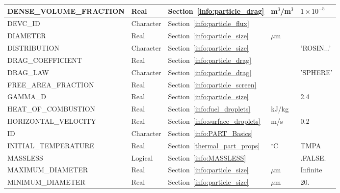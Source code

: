 \documentclass[11pt]{book}
\begin{document}
\begin{longtable}{@{\extracolsep{\fill}}|l|l|l|l|l|}
{\ct DENSE\_VOLUME\_FRACTION}       & Real            & Section~\ref{info:particle_drag}        & m$^3$/m$^3$ & $1\times 10^{-5}$ \\ \hline
{\ct DEVC\_ID}                      & Character       & Section~\ref{info:particle_flux}        &           &               \\ \hline
{\ct DIAMETER}                      & Real            & Section~\ref{info:particle_size}        & $\mu$m    &               \\ \hline
{\ct DISTRIBUTION}                  & Character       & Section~\ref{info:particle_size}        &           & {\ct 'ROSIN...'} \\ \hline
{\ct DRAG\_COEFFICIENT}             & Real            & Section~\ref{info:particle_drag}        &           &               \\ \hline
{\ct DRAG\_LAW}                     & Character       & Section~\ref{info:particle_drag}        &           & {\ct 'SPHERE'}\\ \hline
{\ct FREE\_AREA\_FRACTION}          & Real            & Section~\ref{info:particle_screen}               &           &               \\ \hline
{\ct GAMMA\_D}                      & Real            & Section~\ref{info:particle_size}        &           & 2.4           \\ \hline
{\ct HEAT\_OF\_COMBUSTION}          & Real            & Section~\ref{info:fuel_droplets}        & kJ/kg     &               \\ \hline
{\ct HORIZONTAL\_VELOCITY}          & Real            & Section~\ref{info:surface_droplets}     & m/s       &  0.2          \\ \hline
{\ct ID}                            & Character       & Section~\ref{info:PART_Basics}          &           &               \\ \hline
{\ct INITIAL\_TEMPERATURE}          & Real            & Section~\ref{thermal_part_props}        & $^\circ$C & {\ct TMPA}    \\ \hline
{\ct MASSLESS}                      & Logical         & Section~\ref{info:MASSLESS}             &           & {\ct .FALSE.} \\ \hline
{\ct MAXIMUM\_DIAMETER}             & Real            & Section~\ref{info:particle_size}        & $\mu$m    & Infinite      \\ \hline
{\ct MINIMUM\_DIAMETER}             & Real            & Section~\ref{info:particle_size}        & $\mu$m    & 20.           \\ \hline

\end{longtable}
\end{document}
